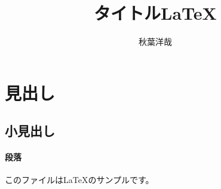 \documentclass{ltjsarticle}
\begin{document}
\title{タイトル\LaTeX }
\author{秋葉洋哉}
\maketitle
\section{見出し}
\subsection{小見出し}
\paragraph{段落}
このファイルは\LaTeX のサンプルです。
\end{document}

